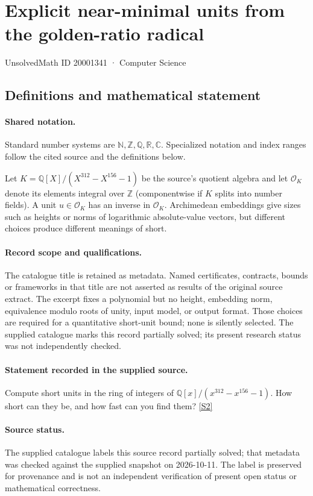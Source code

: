 \documentclass[11pt]{article}
\newcommand{\sref}[2]{\hyperlink{source:#1:#2}{[S#2]}}
\begin{document}
\setcounter{section}{20001340}
\section{Explicit near-minimal units from the golden-ratio radical}\label{20001341}
{\small\sffamily UnsolvedMath ID 20001341 · Computer Science}
\subsection{Definitions and mathematical statement}

\paragraph{Shared notation.}Standard number systems are $\mathbb N,\mathbb Z,\mathbb Q,\mathbb R,\mathbb C$. Specialized notation and index ranges follow the cited source and the definitions below.


Let $K=\mathbb Q[X]/(X^{312}-X^{156}-1)$ be the source's quotient algebra and let $\mathcal O_K$ denote its elements integral over $\mathbb Z$ (componentwise if $K$ splits into number fields). A unit $u\in\mathcal O_K$ has an inverse in $\mathcal O_K$. Archimedean embeddings give sizes such as heights or norms of logarithmic absolute-value vectors, but different choices produce different meanings of short.
\paragraph{Record scope and qualifications.}
The catalogue title is retained as metadata. Named certificates, contracts, bounds or frameworks in that title are not asserted as results of the original source extract.
The excerpt fixes a polynomial but no height, embedding norm, equivalence modulo roots of unity, input model, or output format. Those choices are required for a quantitative short-unit bound; none is silently selected. The supplied catalogue marks this record partially solved; its present research status was not independently checked.
\paragraph{Statement recorded in the supplied source.}
Compute short units in the ring of integers of $\mathbb Q[x]/(x^{312} - x^{156} -1)$. How short can they be, and how fast can you find them? \sref{20001341}{2}
\paragraph{Source status.}
The supplied catalogue labels this source record partially solved; that metadata was checked against the supplied snapshot on 2026-10-11. The label is preserved for provenance and is not an independent verification of present open status or mathematical correctness.
\end{document}
